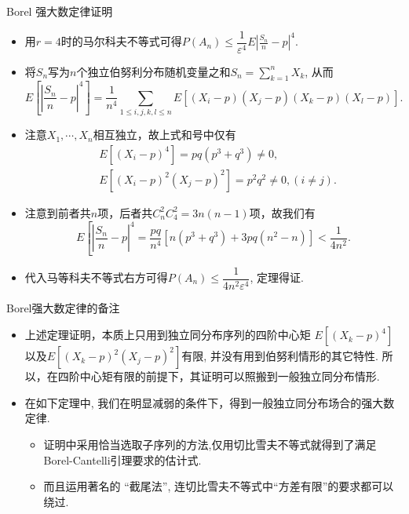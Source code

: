 \begin{frame}{Borel 强大数定律证明}
\begin{itemize}[<+-|alert@+>]
\item 用${r=4}$时的马尔科夫不等式可得$P\left(A_{n}\right) \leq \dfrac{1}{\varepsilon^{4}} E\left|\frac{S_n}{n}-p\right|^{4}.$
\item 将${S_n}$写为${n}$个独立伯努利分布随机变量之和${S_n=\sum_{k=1}^{n} X_{k}}$, 从而
\[
E\left[\left|\frac{S_n}{n}-p\right|^{4}\right]=\frac{1}{n^{4}} \sum_{1 \leq i, j, k, l \leq n} E\left[\left(X_{i}-p\right)\left(X_{j}-p\right)\left(X_{k}-p\right)\left(X_{l}-p\right)\right] .
\]
\item 注意${X_{1}, \cdots, X_{n}}$相互独立，故上式和号中仅有
\begin{align*}
	&E\left[\left(X_{i}-p\right)^{4}\right]=p q\left(p^{3}+q^{3}\right)\neq 0,\\
	  &E\left[\left(X_{i}-p\right)^{2}\left(X_{j}-p\right)^{2}\right]=p^{2} q^{2}\neq 0, (i \neq j).
\end{align*}
\item 注意到前者共${n}$项，后者共$ C_n^2C_4^2=3 n(n-1)$项，故我们有%
\[
E\left[\left|\frac{S_n}{n}-p\right|^{4} =\frac{p q}{n^{4}}\left[n\left(p^{3}+q^{3}\right)+3 p q\left(n^{2}-n\right)\right]<\frac{1}{4 n^{2}} .\right.
\]
\item 代入马等科夫不等式右方可得$P\left(A_{n}\right) \leq \dfrac{1}{4 n^{2} \varepsilon^{4}}$, 定理得证.

\end{itemize}
\end{frame}


\begin{frame}{Borel强大数定律的备注}
  \begin{rmk}
	\begin{itemize}[<+-|alert@+>]
	\item 上述定理证明，本质上只用到独立同分布序列的四阶中心矩
	${E\left[\left(X_{k}-p\right)^{4}\right]}$以及${E\left[\left(X_{k}-p\right)^{2}\left(X_{j}-p\right)^{2}\right]}$有限, 并没有用到伯努利情形的其它特性. 所以，在四阶中心矩有限的前提下，其证明可以照搬到一般独立同分布情形.
	\item 在如下定理中, 我们在明显减弱的条件下，得到一般独立同分布场合的强大数定律.
	\begin{itemize}[<+-|alert@+>]
	\item 证明中采用恰当选取子序列的方法,仅用切比雪夫不等式就得到了满足Borel-Cantelli引理要求的估计式.
	\item 而且运用著名的 “截尾法”, 连切比雪夫不等式中“方差有限”的要求都可以绕过.
	\end{itemize}

	\end{itemize}


  \end{rmk}



\end{frame}




